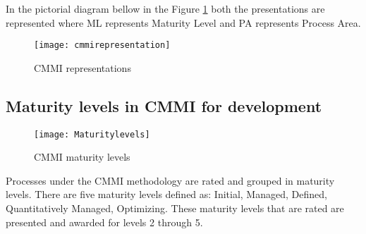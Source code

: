 In the pictorial diagram bellow in the Figure \ref{fig:cmmirepresentation} both the presentations are represented where ML represents Maturity Level and PA represents Process Area.

\begin{figure}[h]
	\begin{center}
		\leavevmode
		\texttt{[image: cmmirepresentation]}
		\caption{CMMI representations}
		\label{fig:cmmirepresentation}
	\end{center}
\end{figure}

\subsection{Maturity levels in CMMI for development}
\begin{figure}[h]
	\begin{center}
		\leavevmode
		\texttt{[image: Maturitylevels]}
		\caption{CMMI maturity levels}
		\label{fig:maturitylevels}
	\end{center}
\end{figure}
Processes under the CMMI methodology are rated and grouped in maturity levels. There are five  maturity levels defined as: Initial, Managed, Defined, Quantitatively Managed, Optimizing. These maturity levels that are rated are presented and awarded for levels 2 through 5.

